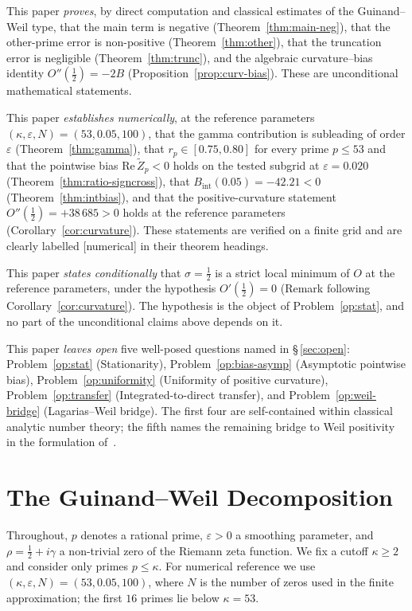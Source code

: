 \documentclass[11pt]{article}
\newcommand{\Zt}{\widetilde{Z}}
\begin{document}
This paper \emph{proves}, by direct computation and classical estimates
of the Guinand--Weil type, that the main term is negative
(Theorem~\ref{thm:main-neg}), that the other-prime error is
non-positive (Theorem~\ref{thm:other}), that the truncation error is
negligible (Theorem~\ref{thm:trunc}), and the algebraic
curvature--bias identity $O''(\tfrac12)=-2B$
(Proposition~\ref{prop:curv-bias}).
These are unconditional mathematical statements.

This paper \emph{establishes numerically}, at the reference parameters
$(\kappa,\varepsilon,N)=(53,0.05,100)$, that the gamma contribution is
subleading of order $\varepsilon$ (Theorem~\ref{thm:gamma}), that
$r_p\in[0.75,0.80]$ for every prime $p\le 53$ and that the pointwise
bias $\mathrm{Re}\,\Zt_p<0$ holds on the tested subgrid at
$\varepsilon=0.020$ (Theorem~\ref{thm:ratio-signcross}), that
$B_{\mathrm{int}}(0.05)=-42.21<0$ (Theorem~\ref{thm:intbias}), and that
the positive-curvature statement $O''(\tfrac12)=+38\,685>0$ holds at
the reference parameters (Corollary~\ref{cor:curvature}).
These statements are verified on a finite grid and are clearly labelled
[numerical] in their theorem headings.

This paper \emph{states conditionally} that $\sigma=\tfrac12$ is a
strict local minimum of $O$ at the reference parameters, under the
hypothesis $O'(\tfrac12)=0$ (Remark following
Corollary~\ref{cor:curvature}).
The hypothesis is the object of Problem~\ref{op:stat}, and no part of
the unconditional claims above depends on it.

This paper \emph{leaves open} five well-posed questions named in
\S\,\ref{sec:open}: Problem~\ref{op:stat} (Stationarity),
Problem~\ref{op:bias-asymp} (Asymptotic pointwise bias),
Problem~\ref{op:uniformity} (Uniformity of positive curvature),
Problem~\ref{op:transfer} (Integrated-to-direct transfer), and
Problem~\ref{op:weil-bridge} (Lagarias--Weil bridge).
The first four are self-contained within classical analytic number
theory; the fifth names the remaining bridge to Weil positivity in
the formulation of~\cite{Lagarias}.

\section{The Guinand--Weil Decomposition}
\label{sec:gw}

Throughout, $p$ denotes a rational prime, $\varepsilon>0$ a smoothing
parameter, and $\rho=\tfrac12+i\gamma$ a non-trivial zero of the
Riemann zeta function.
We fix a cutoff $\kappa\ge 2$ and consider only primes $p\le\kappa$.
For numerical reference we use $(\kappa,\varepsilon,N)=(53,0.05,100)$,
where $N$ is the number of zeros used in the finite approximation;
the first $16$ primes lie below $\kappa=53$.
\end{document}
